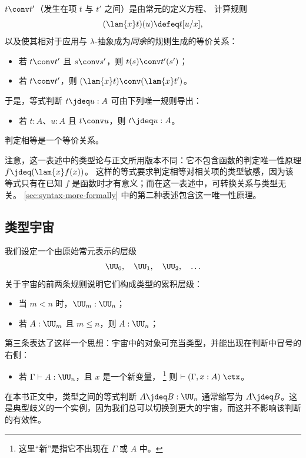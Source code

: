 %
%
$t \conv t'$（发生在项 $t$
与 $t'$ 之间）是由常元的定义方程、
计算规则
%
\[
  (\lam{x} t)(u) \defeq t[u/x],
\]
%
以及使其相对于应用与 $\lambda$-抽象成为\emph{同余}的规则生成的等价关系：
%
\begin{itemize}
\item 若 $t \conv t'$ 且 $s \conv s'$，则 $t(s) \conv t'(s')$；
\item 若 $t \conv t'$，则 $(\lam{x} t) \conv (\lam{x} t')$。
\end{itemize}
\noindent
于是，等式判断 $t \jdeq u : A$ 可由下列唯一规则导出：
%
\begin{itemize}
\item 若 $t:A$、$u:A$ 且 $t \conv u$，则 $t \jdeq u : A$。
\end{itemize}
%
判定相等是一个等价关系。

注意，这一表述中的类型论与正文所用版本不同：它不包含函数的判定唯一性原理 $f \jdeq (\lam{x} f(x))$。
这样的等式要求判定相等对相关项的类型敏感，因为该等式只有在已知 $f$ 是函数时才有意义；而在这一表述中，可转换关系与类型无关。
\cref{sec:syntax-more-formally} 中的第二种表述包含这一唯一性原理。


\subsection{类型宇宙}

我们设定一个由原始常元表示的层级
%
\begin{equation*}
  \UU_0, \quad \UU_1, \quad  \UU_2, \quad \ldots
\end{equation*}
%
关于宇宙的前两条规则说明它们构成类型的累积层级：
%
\begin{itemize}
\item 当 $m < n$ 时，$\UU_m : \UU_n$；
\item 若 $A:\UU_m$ 且 $m \le n$，则 $A:\UU_n$；
\end{itemize}
%
第三条表达了这样一个思想：宇宙中的对象可充当类型，并能出现在判断中冒号的
右侧：
%
\begin{itemize}
\item 若 $\Gamma \vdash A : \UU_n$，且 $x$ 是一个新变量，%
\footnote{这里“新”是指它不出现在 $\Gamma$ 或 $A$ 中。}
则 $\vdash (\Gamma, x:A)\; \ctx$。
\end{itemize}
%
在本书正文中，类型之间的等式判断 $A \jdeq B : \UU_n$
通常缩写为 $A \jdeq B$。这是典型歧义的一个实例，因为我们总可以切换到更大的宇宙，而这并不影响该判断的有效性。

